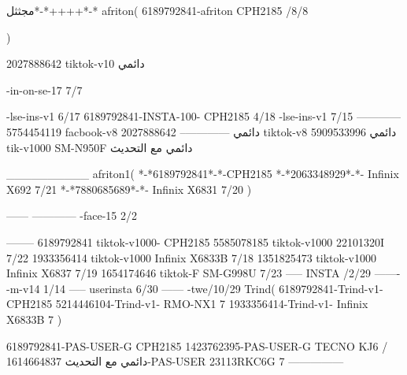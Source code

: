 مجثثل*-*++++*-*
afriton(
6189792841-afriton CPH2185  /8/8

)

2027888642 tiktok-v10
دائمي

-in-on-se-17 7/7

-lse-ins-v1 6/17
6189792841-INSTA-100- CPH2185 4/18
-lse-ins-v1 7/15
------------
5754454119 facbook-v8
دائمي
--------------
2027888642 tiktok-v8
دائمي
5909533996 tik-v1000  SM-N950F
دائمي مع التحديث

__________
afriton1(
*-*6189792841*-*-CPH2185
*-*2063348929*-*-  Infinix X692  7/21
*-*7880685689*-*-   Infinix X6831  7/20
)


------
------------
-face-15 2/2

--------
6189792841 tiktok-v1000- CPH2185 
5585078185 tiktok-v1000 22101320I  7/22
1933356414 tiktok-v1000 Infinix X6833B  7/18
1351825473 tiktok-v1000 Infinix X6837  7/19
1654174646 tiktok-F SM-G998U  7/23
-----
 INSTA /2/29
-------
-m-v14 1/14
-----
userinsta 6/30
------
-twe/10/29
Trind(
6189792841-Trind-v1- CPH2185 
5214446104-Trind-v1- RMO-NX1 7
1933356414-Trind-v1- Infinix X6833B 7
)


6189792841-PAS-USER-G CPH2185 
1423762395-PAS-USER-G TECNO KJ6  /دائمي مع التحديث
1614664837-PAS-USER 23113RKC6G 7
    ---------------
